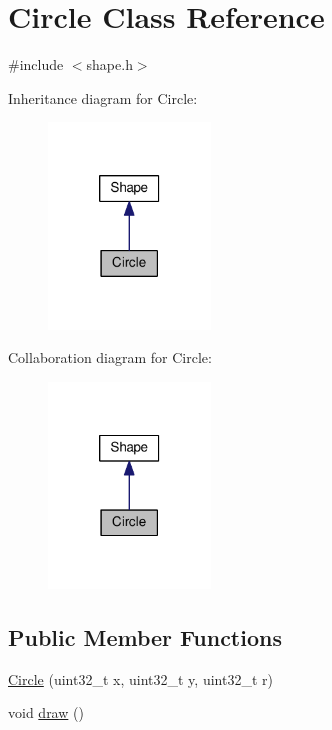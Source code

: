 \hypertarget{class_circle}{\section{Circle Class Reference}
\label{class_circle}
}


{\ttfamily \#include $<$shape.\-h$>$}



Inheritance diagram for Circle\-:
\nopagebreak
\begin{figure}[H]
\begin{center}
\leavevmode
\includegraphics[width=122pt]{class_circle__inherit__graph}
\end{center}
\end{figure}


Collaboration diagram for Circle\-:
\nopagebreak
\begin{figure}[H]
\begin{center}
\leavevmode
\includegraphics[width=122pt]{class_circle__coll__graph}
\end{center}
\end{figure}
\subsection*{Public Member Functions}
\begin{DoxyCompactItemize}
\item 
\hyperlink{class_circle_aacd40dfd23f14473402390dada4d5083}{Circle} (uint32\-\_\-t x, uint32\-\_\-t y, uint32\-\_\-t r)
\item 
void \hyperlink{class_circle_a3a3f7166e7f629e44f9044b0e537eb22}{draw} ()
\end{DoxyCompactItemize}
